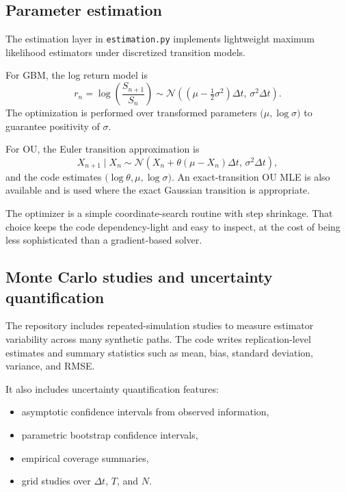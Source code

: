 \documentclass[11pt]{article}
\newcommand{\N}{\mathcal{N}}
\begin{document}
\subsection{Parameter estimation}

The estimation layer in \texttt{estimation.py} implements lightweight maximum likelihood estimators under discretized transition models.

For GBM, the log return model is
\begin{equation}
  r_n = \log\left(\frac{S_{n+1}}{S_n}\right)
  \sim \N\left(\left(\mu - \tfrac{1}{2}\sigma^2\right)\Delta t,\,\sigma^2\Delta t\right).
\end{equation}
The optimization is performed over transformed parameters $\bigl(\mu, \log\sigma\bigr)$ to guarantee positivity of $\sigma$.

For OU, the Euler transition approximation is
\begin{equation}
  X_{n+1}\mid X_n \sim \N\left(X_n + \theta(\mu - X_n)\Delta t,\,\sigma^2\Delta t\right),
\end{equation}
and the code estimates $\bigl(\log\theta, \mu, \log\sigma\bigr)$. An exact-transition OU MLE is also available and is used where the exact Gaussian transition is appropriate.

The optimizer is a simple coordinate-search routine with step shrinkage. That choice keeps the code dependency-light and easy to inspect, at the cost of being less sophisticated than a gradient-based solver.

\subsection{Monte Carlo studies and uncertainty quantification}

The repository includes repeated-simulation studies to measure estimator variability across many synthetic paths. The code writes replication-level estimates and summary statistics such as mean, bias, standard deviation, variance, and RMSE.

It also includes uncertainty quantification features:
\begin{itemize}[leftmargin=1.2em]
  \item asymptotic confidence intervals from observed information,
  \item parametric bootstrap confidence intervals,
  \item empirical coverage summaries,
  \item grid studies over $\Delta t$, $T$, and $N$.
\end{itemize}
\end{document}

